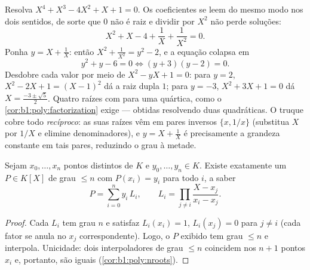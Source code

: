 \begin{example}\label{ex:b1:poly:palindrome}
Resolva $X^4 + X^3 - 4X^2 + X + 1 = 0$. Os coeficientes se leem do
mesmo modo nos dois sentidos, de sorte que $0$ não é raiz e dividir por
$X^2$ não perde soluções:
\[
X^2 + X - 4 + \frac1X + \frac1{X^2} = 0 .
\]
Ponha $y = X + \frac1X$: então $X^2 + \frac1{X^2} = y^2 - 2$, e
a equação colapsa em
\[
y^2 + y - 6 = 0 \iff (y + 3)(y - 2) = 0 .
\]
Desdobre cada valor por meio de $X^2 - yX + 1 = 0$: para $y = 2$, $X^2 -
2X + 1 = (X - 1)^2$ dá a raiz dupla $1$; para $y = -3$,
$X^2 + 3X + 1 = 0$ dá $X = \frac{-3 \pm \sqrt5}2$. Quatro raízes
com  para uma quártica, como o
\cref{cor:b1:poly:factorization} exige --- obtidas resolvendo
duas quadráticas. O truque cobre todo  \emph{recíproco}:
as suas raízes vêm em pares inversos $\{x, 1/x\}$
(substitua $X$ por $1/X$ e elimine denominadores), e $y = X +
\frac1X$ é precisamente a grandeza constante em tais pares,
reduzindo o grau à metade.
\end{example}

\begin{theorem}\label{thm:b1:poly:lagrange}
Sejam $x_0, \dots, x_n$ pontos distintos de $K$ e $y_0, \dots, y_n
\in K$. Existe exatamente um $P \in K[X]$ de grau $\leq n$ com
$P(x_i) = y_i$ para todo $i$, a saber
\[
P = \sum_{i=0}^{n} y_i\, L_i,
\qquad
L_i = \prod_{j \neq i} \frac{X - x_j}{x_i - x_j} .
\]
\end{theorem}

\begin{proof}
Cada $L_i$ tem grau $n$ e satisfaz $L_i(x_i) = 1$, $L_i(x_j) =
0$ para $j \neq i$ (cada fator se anula no $x_j$ correspondente).
Logo, o $P$ exibido tem grau $\leq n$ e interpola. Unicidade:
dois  interpoladores de grau $\leq n$ coincidem nos $n+1$
pontos $x_i$ e, portanto, são iguais (\cref{cor:b1:poly:nroots}).
\end{proof}

